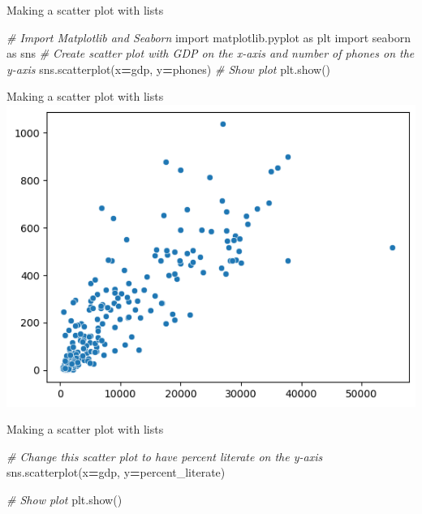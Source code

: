 \documentclass[
  ignorenonframetext,
]{beamer}
\newenvironment{Shaded}{\begin{snugshade}}{\end{snugshade}}
\newcommand{\CommentTok}[1]{\textcolor[rgb]{0.56,0.35,0.01}{\textit{#1}}}
\newcommand{\ImportTok}[1]{#1}
\newcommand{\NormalTok}[1]{#1}
\newcommand{\OperatorTok}[1]{\textcolor[rgb]{0.81,0.36,0.00}{\textbf{#1}}}
\begin{document}
\begin{frame}[fragile]{Making a scatter plot with lists}
\label{making-a-scatter-plot-with-lists-6}

\begin{Shaded}
\begin{Highlighting}[]
\CommentTok{\# Import Matplotlib and Seaborn}
\ImportTok{import}\NormalTok{ matplotlib.pyplot }\ImportTok{as}\NormalTok{ plt}
\ImportTok{import}\NormalTok{ seaborn }\ImportTok{as}\NormalTok{ sns}
\CommentTok{\# Create scatter plot with GDP on the x{-}axis and number of phones on the y{-}axis}
\NormalTok{sns.scatterplot(x}\OperatorTok{=}\NormalTok{gdp, y}\OperatorTok{=}\NormalTok{phones)}
\CommentTok{\# Show plot}
\NormalTok{plt.show()}
\end{Highlighting}
\end{Shaded}
\end{frame}

\begin{frame}{Making a scatter plot with lists}
\label{making-a-scatter-plot-with-lists-7}
\includegraphics{../images/im253.png}
\end{frame}

\begin{frame}[fragile]{Making a scatter plot with lists}
\label{making-a-scatter-plot-with-lists-8}

\begin{Shaded}
\begin{Highlighting}[]
\CommentTok{\# Change this scatter plot to have percent literate on the y{-}axis}
\NormalTok{sns.scatterplot(x}\OperatorTok{=}\NormalTok{gdp, y}\OperatorTok{=}\NormalTok{percent\_literate)}

\CommentTok{\# Show plot}
\NormalTok{plt.show()}
\end{Highlighting}
\end{Shaded}
\end{frame}
\end{document}
